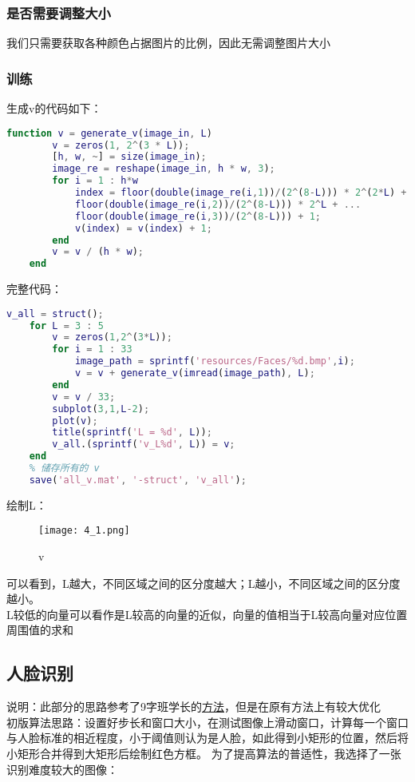 \documentclass[12pt]{article}
\begin{document}
\subsubsection{是否需要调整大小}
我们只需要获取各种颜色占据图片的比例，因此无需调整图片大小
\subsubsection{训练}
生成v的代码如下：
\begin{lstlisting}[language=matlab]
    function v = generate_v(image_in, L)
        v = zeros(1, 2^(3 * L));
        [h, w, ~] = size(image_in);
        image_re = reshape(image_in, h * w, 3);
        for i = 1 : h*w
            index = floor(double(image_re(i,1))/(2^(8-L))) * 2^(2*L) + ... 
            floor(double(image_re(i,2))/(2^(8-L))) * 2^L + ... 
            floor(double(image_re(i,3))/(2^(8-L))) + 1;
            v(index) = v(index) + 1;
        end
        v = v / (h * w);
    end
\end{lstlisting}

完整代码：
\begin{lstlisting}[language=matlab]
    v_all = struct();
    for L = 3 : 5
        v = zeros(1,2^(3*L));
        for i = 1 : 33
            image_path = sprintf('resources/Faces/%d.bmp',i);
            v = v + generate_v(imread(image_path), L);
        end
        v = v / 33;
        subplot(3,1,L-2);
        plot(v);
        title(sprintf('L = %d', L));
        v_all.(sprintf('v_L%d', L)) = v;
    end
    % 储存所有的 v
    save('all_v.mat', '-struct', 'v_all');
\end{lstlisting}

绘制L：
\begin{figure}[H]
    \centering
    \texttt{[image: 4\_1.png]}
    \caption{v}
\end{figure}

可以看到，L越大，不同区域之间的区分度越大；L越小，不同区域之间的区分度越小。\\
\hspace*{2em} L较低的向量可以看作是L较高的向量的近似，向量的值相当于L较高向量对应位置周围值的求和
\subsection{人脸识别}
说明：此部分的思路参考了9字班学长的\href{https://github.com/Timothy-Liuxf/THUEE_MATLAB/tree/master/image}{方法}，但是在原有方法上有较大优化\\
\hspace*{2em}初版算法思路：设置好步长和窗口大小，在测试图像上滑动窗口，计算每一个窗口与人脸标准的相近程度，小于阈值则认为是人脸，如此得到小矩形的位置，然后将小矩形合并得到大矩形后绘制红色方框。
为了提高算法的普适性，我选择了一张识别难度较大的图像：
\end{document}
